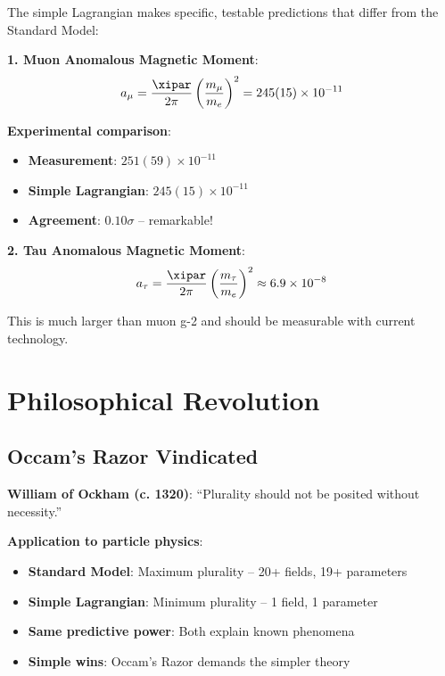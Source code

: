 	The simple Lagrangian makes specific, testable predictions that differ from the Standard Model:
	
	\textbf{1. Muon Anomalous Magnetic Moment}:
	\begin{equation}
		a_{\mu} = \frac{\xipar}{2\pi} \left(\frac{m_{\mu}}{m_e}\right)^2 = 245(15) \times 10^{-11}
	\end{equation}
	
	\textbf{Experimental comparison}:
	\begin{itemize}
		\item \textbf{Measurement}: $251(59) \times 10^{-11}$
		\item \textbf{Simple Lagrangian}: $245(15) \times 10^{-11}$
		\item \textbf{Agreement}: $0.10\sigma$ -- remarkable!
	\end{itemize}
	
	\textbf{2. Tau Anomalous Magnetic Moment}:
	\begin{equation}
		a_{\tau} = \frac{\xipar}{2\pi} \left(\frac{m_{\tau}}{m_e}\right)^2 \approx 6.9 \times 10^{-8}
	\end{equation}
	
	This is much larger than muon g-2 and should be measurable with current technology.
	
	\section{Philosophical Revolution}
	
	\subsection{Occam's Razor Vindicated}
	
	\begin{tcolorbox}[colback=blue!5!white,colframe=blue!75!black,title=Occam's Razor in Pure Form]
		\textbf{William of Ockham (c. 1320)}: ``Plurality should not be posited without necessity.''
		
		\textbf{Application to particle physics}:
		\begin{itemize}
			\item \textbf{Standard Model}: Maximum plurality -- 20+ fields, 19+ parameters
			\item \textbf{Simple Lagrangian}: Minimum plurality -- 1 field, 1 parameter
			\item \textbf{Same predictive power}: Both explain known phenomena
			\item \textbf{Simple wins}: Occam's Razor demands the simpler theory
		\end{itemize}
	\end{tcolorbox}
	
